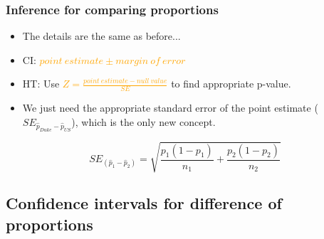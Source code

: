 \documentclass[slidestop,compress,mathserif]{beamer}
\begin{document}
\begin{frame}
\frametitle{Inference for comparing proportions}

\begin{itemize}

\item The details are the same as before...

\pause

\item CI: \textcolor{orange}{$point~estimate \pm margin~of~error$}

\pause

\item HT: Use \textcolor{orange}{$Z = \frac{point~estimate - null~value}{SE}$} to find appropriate p-value.

\pause

\item We just need the appropriate standard error of the point estimate ($SE_{ \hat{p}_{Duke} - \hat{p}_{US}}$), which is the only new concept.

\end{itemize}

\pause

{
\[ SE_{(\hat{p}_1 - \hat{p}_2)} = \sqrt{ \frac{p_1(1-p_1)}{n_1} + \frac{p_2(1-p_2)}{n_2} } \]
}

\end{frame}


\subsection{Confidence intervals for difference of proportions}

\end{document}
